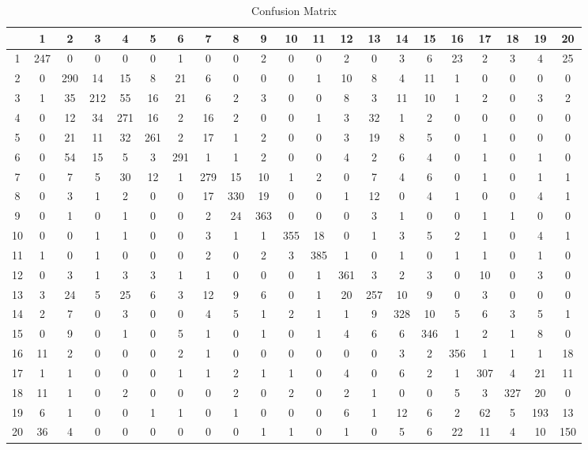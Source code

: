 \documentclass{IEEEtran}
\begin{document}
\begin{table}[ht]
  \caption{Confusion Matrix}
  \centering
  \begin{tabular}{c c c c c c c c c c c c c c c c c c c c c}
   \hline\hline
       &  1 &   2 &   3 &   4 &   5 &   6 &   7 &   8 &   9 &  10 &  11 &  12 &  13 &  14 &  15 &  16 &  17 &  18 &  19 &  20 \\
   \hline
     1 & 247 &   0 &   0 &   0  & 0 &  1 & 0 & 0 & 2 & 0 & 0 &  2 & 0 & 3 &  6 & 23 & 2 & 3 & 4 & 25 \\
     2 &   0 & 290 &  14 &  15  & 8 & 21 & 6 & 0 & 0 & 0 & 1 & 10 & 8 & 4 & 11 &  1 & 0 & 0 & 0 &  0 \\
     3 &   1 &  35 & 212 &  55  &16&21&6&2&3&0&0&8&3&11&10&1&2&0&3&2 \\
     4 &   0 &  12 &  34 & 271 &16&2&16&2&0&0&1&3&32&1&2&0&0&0&0&0 \\
     5 &   0 &  21 &  11 &  32 &261&2&17&1&2&0&0&3&19&8&5&0&1&0&0&0 \\
     6 &   0 &  54 &  15 &   5 &3&291&1&1&2&0&0&4&2&6&4&0&1&0&1&0 \\
     7 &   0 &   7 &   5 &  30 &12&1&279&15&10&1&2&0&7&4&6&0&1&0&1&1 \\
     8 &   0 &   3 &   1 &   2 &0&0&17&330&19&0&0&1&12&0&4&1&0&0&4&1 \\
     9 &   0 &   1 &   0 &   1 &0&0&2&24&363&0&0&0&3&1&0&0&1&1&0&0 \\
    10 &   0 &   0 &   1 &   1 &0&0&3&1&1&355&18&0&1&3&5&2&1&0&4&1 \\
    11 &   1 &   0 &   1 &   0 &0&0&2&0&2&3&385&1&0&1&0&1&1&0&1&0 \\
    12 &   0 &   3 &   1 &   3 &3&1&1&0&0&0&1&361&3&2&3&0&10&0&3&0 \\
    13 &   3 &  24 &   5 &  25 &6&3&12&9&6&0&1&20&257&10&9&0&3&0&0&0 \\
    14 &   2 &   7 &   0 &   3 &0&0&4&5&1&2&1&1&9&328&10&5&6&3&5&1 \\
    15 &   0 &   9 &   0 &   1 &0&5&1&0&1&0&1&4&6&6&346&1&2&1&8&0 \\
    16 &  11 &   2 &   0 &   0 &0&2&1&0&0&0&0&0&0&3&2&356&1&1&1&18 \\
    17 &   1 &   1 &   0 &   0 &0&1&1&2&1&1&0&4&0&6&2&1&307&4&21&11 \\
    18 &  11 &   1 &   0 &   2 &0&0&0&2&0&2&0&2&1&0&0&5&3&327&20&0 \\
    19 &   6 &   1 &   0 &   0 &1&1&0&1&0&0&0&6&1&12&6&2&62&5&193&13 \\
    20 &  36 &   4 &   0 &   0 &0&0&0&0&1&1&0&1&0&5&6&22&11&4&10&150 \\
    \hline
  \end{tabular}
  \label{table:confmatrix}
\end{table}
\end{document}
